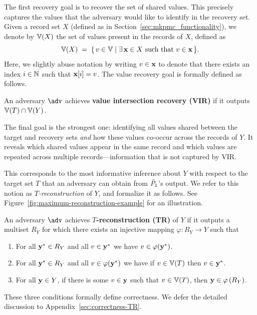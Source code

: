 The first recovery goal is to recover the set of shared values. This precisely captures the values that the adversary would like to identify in the recovery
set. Given a record set $X$ (defined as in Section~\ref{sec:mkpmc_functionality}),
we denote by $\Ispace[X]$ the set of values present in the records of $X$,
defined as
\[
  \Ispace[X] \;=\; \{\, v \in \Ispace{} \mid \exists\, \bx \in X \text{ such that
  } v \in \bx \,\}.
\]
Here, we slightly abuse notation by writing $v \in \mathbf{x}$ to denote that there
exists an index $i \in \mathbb{N}$ such that $\mathbf{x}[i] = v$. The value recovery
goal is formally defined as follows.

\begin{definition}\label{def:VIR_goal}
  An adversary $\adv$ achieves \textbf{value intersection recovery (VIR)} if it
  outputs $\Ispace[T] \cap \Ispace[Y]$.
\end{definition}

The final goal is the strongest one: identifying all values shared between the
target and recovery sets \emph{and} how these values co-occur across the records
of $Y$. It reveals which shared values appear in the same record
and which values are repeated across multiple records---information that is not
captured by VIR.

This corresponds to the most informative inference about $Y$ with respect to the
target set $T$ that an adversary can obtain from $\tilde{P}_1$’s output. We refer to
this notion as \emph{$T$-reconstruction} of $Y$, and formalize it as
follows. See Figure~\ref{fig:maximum-reconstruction-example} for an
illustration.

\begin{definition}\label{def:max_recons}
  An adversary $\adv$ achieves \textbf{$T$-reconstruction (TR)} of $Y$ if it
  outputs a multiset $R_Y$ for which there exists an injective mapping
  $\varphi : R_Y \to Y$ such that
  \begin{enumerate}
  \item For all $\mathbf{y}^* \in R_Y$ and all $v \in \mathbf{y}^*$ we have $v\in
    \varphi(\mathbf{y}^*)$.
  \item For all $\mathbf{y}^* \in R_Y$ and all $v \in\varphi(\mathbf{y}^*)$ we have if
    $v \in \Ispace[T]$ then $v \in \mathbf{y}^*$.
  \item For all $\mathbf{y} \in Y$, if there is some $v \in \mathbf{y}$ 
    such that $v \in \Ispace[T]$, then $\mathbf{y} \in \varphi\left(R_Y\right)$. 
  \end{enumerate} 
\end{definition}
These three conditions formally define correctness. We defer the detailed
discussion to Appendix~\ref{sec:correctness-TR}.

